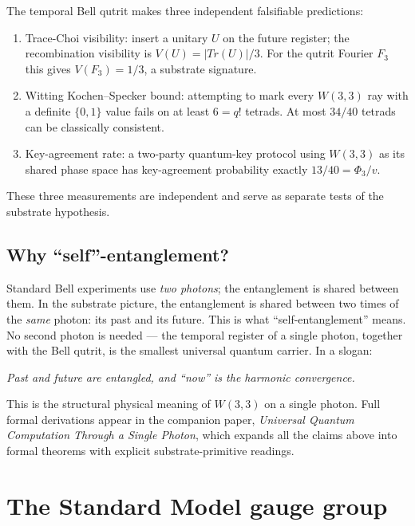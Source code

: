 \documentclass[11pt]{article}
\def\mathrm#1{#1}%
\def\textbf#1{#1}%
\def\Phi#1{Phi#1}%
\begin{document}
The temporal Bell qutrit makes three independent falsifiable predictions:

\begin{enumerate}[leftmargin=2em]
\item \textbf{Trace-Choi visibility:} insert a unitary $U$ on the future
  register; the recombination visibility is $V(U) = |\mathrm{Tr}(U)|/3$.
  For the qutrit Fourier $F_3$ this gives $V(F_3) = 1/3$, a substrate
  signature.
\item \textbf{Witting Kochen--Specker bound:} attempting to mark every
  $W(3,3)$ ray with a definite $\{0,1\}$ value fails on at least
  $6 = q!$ tetrads.  At most $34/40$ tetrads can be classically consistent.
\item \textbf{Key-agreement rate:} a two-party quantum-key protocol using
  $W(3,3)$ as its shared phase space has key-agreement probability exactly
  $13/40 = \Phi_3/v$.
\end{enumerate}

These three measurements are independent and serve as separate tests of the
substrate hypothesis.

\subsection*{Why ``self''-entanglement?}

Standard Bell experiments use \emph{two photons}; the entanglement is shared
between them.  In the substrate picture, the entanglement is shared between
two times of the \emph{same} photon: its past and its future.  This is what
``self-entanglement'' means.  No second photon is needed --- the temporal
register of a single photon, together with the Bell qutrit, is the smallest
universal quantum carrier.  In a slogan:

\begin{center}
\emph{Past and future are entangled, and ``now'' is the harmonic convergence.}
\end{center}

This is the structural physical meaning of $W(3,3)$ on a single photon.
Full formal derivations appear in the companion paper, \emph{Universal
Quantum Computation Through a Single Photon}, which expands all the claims
above into formal theorems with explicit substrate-primitive readings.

\section{The Standard Model gauge group}
\end{document}
